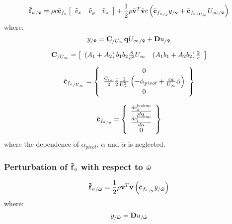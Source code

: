 \begin{equation}
{\bm{\mathbf{\tilde{f}}}_a}_{/\tilde{\bm{\mathbf{v}}}} = 
	\rho c \tilde{\bm{\mathbf{c}}}_{f_{a}} \left[
		\begin{array}{ccc}
			\tilde{v}_x & \tilde{v}_y & \tilde{v}_z
		\end{array} \right] +
	\frac{1}{2} \rho \tilde{\bm{\mathbf{v}}}^T \tilde{\bm{\mathbf{v}}} c
	\left(  \tilde{\bm{\mathbf{c}}}_{{f_{a}}_{/y}} y_{/\tilde{\bm{\mathbf{v}}}} + 
	\tilde{\bm{\mathbf{c}}}_{{f_{a}}_{/U_{\infty}}} {U_\infty}_{/\tilde{\bm{\mathbf{v}}}}  \right) 
\end{equation}
where:
\begin{equation}
y_{/\tilde{\bm{\mathbf{v}}}} = 
	\bm{\mathbf{C}}_{/U_{\infty}} \bm{\mathbf{q}}{U_\infty}_{/\tilde{\bm{\mathbf{v}}}}
	+ \bm{\mathbf{D}} u_{/\tilde{\bm{\mathbf{v}}}}
\end{equation}


\begin{equation}
\bm{\mathbf{C}}_{/U_\infty} = \left[
	\begin{array}{cccccc}
	\left(  A_1 + A_2 \right) b_1 b_2 \frac{8}{c^2} U_\infty & \left(  A_1 b_1 + A_2 b_2 \right) \frac{2}{c}\\
	\end{array}
	\right]
\end{equation}

\begin{equation}
\tilde{\bm{\mathbf{c}}}_{{f_{a}}_{/U_{\infty}}} = \left\{
	\begin{array}{c}
		0 \\
		\frac{C_{l_{\alpha}}}{2} \frac{c}{2} \frac{1}{U_\infty^2} 
		\left(  -\dot{\alpha}_{pivot} + \frac{c a}{U_\infty} \ddot{\alpha} \right) \\
		0
	\end{array} \right\}
\end{equation}

\begin{equation}
\tilde{\bm{\mathbf{c}}}_{{f_{a}}_{/y}} = \left\{
	\begin{array}{cccc}
		\frac{ d c_d^{\text{lookup}}}{d \alpha}\\
		\frac{ d c_l^{\text{lookup}}}{d \alpha}\\
		0
	\end{array} \right\}
\end{equation}
where the dependence of $\dot{\alpha}_{pivot}$, $\dot{\alpha}$ and $\ddot{\alpha}$ is 
neglected.

\subsubsection{Perturbation of $\bm{\mathbf{\tilde{f}}}_a$ with respect to $\tilde{\bm{\mathbf{\omega}}}$}
\begin{equation}
{\bm{\mathbf{\tilde{f}}}_a}_{/\tilde{\bm{\mathbf{\omega}}}} = 
	\frac{1}{2} \rho \tilde{\bm{\mathbf{v}}}^T \tilde{\bm{\mathbf{v}}} 
	\left(  \tilde{\bm{\mathbf{c}}}_{{f_{a}}_{/\bm{\mathbf{y}}}} y_{/\tilde{\bm{\mathbf{\omega}}}}  \right) 
\end{equation}
where:
\begin{equation}
y_{/\tilde{\bm{\mathbf{\omega}}}} = 
	\bm{\mathbf{D}} u_{/\tilde{\bm{\mathbf{\omega}}}}
\end{equation}
